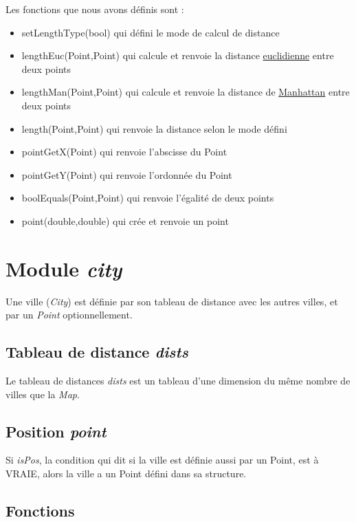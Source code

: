 \documentclass[12pt]{report}
\begin{document}
Les fonctions que nous avons définis sont : 
\begin{itemize}
	\item setLengthType(bool) qui défini le mode de calcul de distance
    \item lengthEuc(Point,Point) qui calcule et renvoie la distance \underline{euclidienne} entre deux points
    \item lengthMan(Point,Point) qui calcule et renvoie la distance de \underline{Manhattan} entre deux points
    \item length(Point,Point) qui renvoie la distance selon le mode défini
    \item pointGetX(Point) qui renvoie l'abscisse du Point
    \item pointGetY(Point) qui renvoie l'ordonnée du Point
    \item boolEquals(Point,Point) qui renvoie l'égalité de deux points
    \item point(double,double) qui crée et renvoie un point 
\end{itemize}

\section{Module \textit{city}}

Une ville (\textit{City}) est définie par son tableau de distance avec les autres villes,  et par un \textit{Point} optionnellement.


\subsection{Tableau de distance \textit{dists}}

Le tableau de distances \textit{dists} est un tableau d'une dimension du même nombre de villes que la \textit{Map}.

\subsection{Position \textit{point}}

Si \textit{isPos}, la condition qui dit si la ville est définie aussi par un Point, est à VRAIE, alors la ville a un Point défini dans sa structure.

\subsection{Fonctions}
\end{document}
